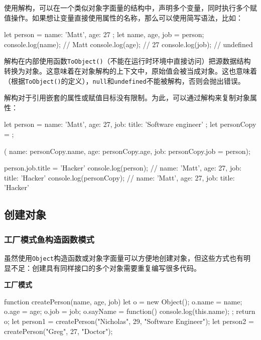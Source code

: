 使用解构，可以在一个类似对象字面量的结构中，声明多个变量，同时执行多个赋值操作。如果想让变量直接使用属性的名称，那么可以使用简写语法，比如：

\begin{JavaScript}
let person = {    
    name: 'Matt',   
    age: 27 
}; 
let { name, age, job } = person; 
console.log(name);  // Matt 
console.log(age);   // 27 
console.log(job);   // undefined 
\end{JavaScript}

解构在内部使用函数\texttt{ToObject()}（不能在运行时环境中直接访问）把源数据结构转换为对象。这意味着在对象解构的上下文中，原始值会被当成对象。这也意味着（根据\texttt{ToObject()}的定义），\texttt{null}和\texttt{undefined}不能被解构，否则会抛出错误。

解构对于引用嵌套的属性或赋值目标没有限制。为此，可以通过解构来复制对象属性：

\begin{JavaScript}
let person = {    
    name: 'Matt',   
    age: 27,   
    job: {     
        title: 'Software engineer'   
    } 
}; 
let personCopy = {}; 

({   
    name: personCopy.name,   
    age: personCopy.age,   
    job: personCopy.job 
} = person); 

person.job.title = 'Hacker' 
console.log(person);        // { name: 'Matt', age: 27, job: { title: 'Hacker' } } 
console.log(personCopy);    // { name: 'Matt', age: 27, job: { title: 'Hacker' } } 
\end{JavaScript}

\subsection{创建对象}

\subsubsection{工厂模式鱼构造函数模式}

虽然使用\texttt{Object}构造函数或对象字面量可以方便地创建对象，但这些方式也有明显不足：创建具有同样接口的多个对象需要重复编写很多代码。

\noindent\textbf{工厂模式}

\begin{JavaScript}
function createPerson(name, age, job) {   
    let o = new Object();    
    o.name = name;   
    o.age = age;   
    o.job = job;   
    o.sayName = function() {     
        console.log(this.name);   
    };   
    return o; 
} 
let person1 = createPerson("Nicholas", 29, "Software Engineer"); 
let person2 = createPerson("Greg", 27, "Doctor");
\end{JavaScript}

